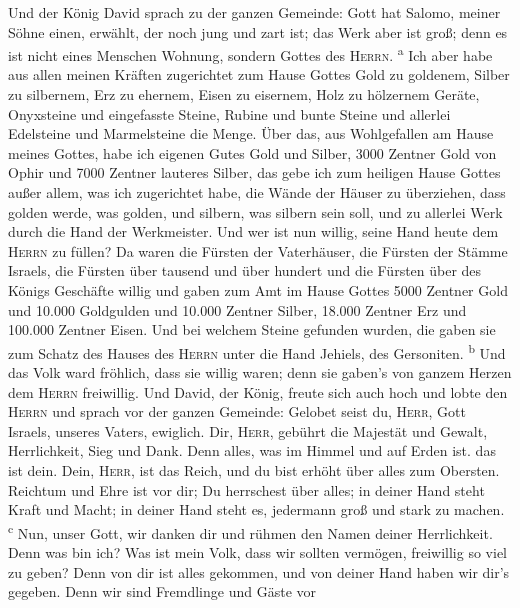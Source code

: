  Und der König David sprach zu der ganzen Gemeinde: Gott
hat Salomo, meiner Söhne einen, erwählt, der noch jung und zart ist; das
Werk aber ist groß; denn es ist nicht eines Menschen Wohnung, sondern
Gottes des \textsc{Herrn}. \textsuperscript{a}  Ich aber
habe aus allen meinen Kräften zugerichtet zum Hause Gottes Gold zu
goldenem, Silber zu silbernem, Erz zu ehernem, Eisen zu eisernem, Holz
zu hölzernem Geräte, Onyxsteine und eingefasste Steine, Rubine und bunte
Steine und allerlei Edelsteine und Marmelsteine die Menge.
 Über das, aus Wohlgefallen am Hause meines Gottes, habe
ich eigenen Gutes Gold und Silber,  3000 Zentner Gold von
Ophir und 7000 Zentner lauteres Silber, das gebe ich zum heiligen Hause
Gottes außer allem, was ich zugerichtet habe, die Wände der Häuser zu
überziehen,  dass golden werde, was golden, und silbern,
was silbern sein soll, und zu allerlei Werk durch die Hand der
Werkmeister. Und wer ist nun willig, seine Hand heute dem \textsc{Herrn}
zu füllen?  Da waren die Fürsten der Vaterhäuser, die
Fürsten der Stämme Israels, die Fürsten über tausend und über hundert
und die Fürsten über des Königs Geschäfte willig  und
gaben zum Amt im Hause Gottes 5000 Zentner Gold und 10.000 Goldgulden
und 10.000 Zentner Silber, 18.000 Zentner Erz und 100.000 Zentner Eisen.
 Und bei welchem Steine gefunden wurden, die gaben sie zum
Schatz des Hauses des \textsc{Herrn} unter die Hand Jehiels, des
Gersoniten. \textsuperscript{b}  Und das Volk ward
fröhlich, dass sie willig waren; denn sie gaben's von ganzem Herzen dem
\textsc{Herrn} freiwillig. Und David, der König, freute sich auch hoch
 und lobte den \textsc{Herrn} und sprach vor der ganzen
Gemeinde: Gelobet seist du, \textsc{Herr}, Gott Israels, unseres Vaters,
ewiglich.  Dir, \textsc{Herr}, gebührt die Majestät und
Gewalt, Herrlichkeit, Sieg und Dank. Denn alles, was im Himmel und auf
Erden ist. das ist dein. Dein, \textsc{Herr}, ist das Reich, und du bist
erhöht über alles zum Obersten.  Reichtum und Ehre ist
vor dir; Du herrschest über alles; in deiner Hand steht Kraft und Macht;
in deiner Hand steht es, jedermann groß und stark zu machen.
\textsuperscript{c}  Nun, unser Gott, wir danken dir und
rühmen den Namen deiner Herrlichkeit.  Denn was bin ich?
Was ist mein Volk, dass wir sollten vermögen, freiwillig so viel zu
geben? Denn von dir ist alles gekommen, und von deiner Hand haben wir
dir's gegeben.  Denn wir sind Fremdlinge und Gäste vor
